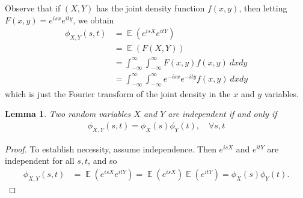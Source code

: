 \documentclass[12pt]{article}
\DeclareMathOperator{\ex}{\mathbb{E}}
\theoremstyle{plain}
\newtheorem{lemma}[theorem]{Lemma}
\theoremstyle{definition}
\theoremstyle{remark}
\numberwithin{equation}{section}  %
\begin{document}
Observe that if $(X, Y)$ has the joint density function $f(x, y)$, then
letting $F(x, y) = e^{isx} e^{ity}$, we obtain
\begin{equation*}
\begin{split}
\phi_{X,Y}(s,t) & = \ex(e^{isX} e^{itY})
\\
& = \ex(F(X, Y))
\\
& = \int_{-\infty}^{\infty}\int_{-\infty}^{\infty} F(x, y) f(x, y) \ dx  dy
\\
& = \int_{-\infty}^{\infty}\int_{-\infty}^{\infty} e^{-isx} e^{-ity}
f(x, y) \ dx  dy
\end{split}
\end{equation*}
which is just the Fourier transform of the joint density in the $x$ and $y$
variables.
\begin{lemma}\label{lem:char-ind}
Two random variables $X$ and $Y$ are independent if and only if
\begin{equation*}
\begin{split}
	\phi_{X, Y}(s, t)= \phi_{X}(s) \phi_{Y}(t), \quad \forall s, t
\end{split}
\end{equation*}
\end{lemma}
\begin{proof}
To establish necessity, assume independence. Then
$e^{isX}$ and $e^{itY}$ are independent for all $s, t$, and so
\begin{equation*}
\begin{split}
	\phi_{X,Y}(s,t) & = \ex(e^{isX} e^{itY}) = \ex(e^{isX}) \ex(e^{itY})
	= \phi_{X}(s) \phi_{Y}(t).
\end{split}
\end{equation*}
\end{proof}
\end{document}
